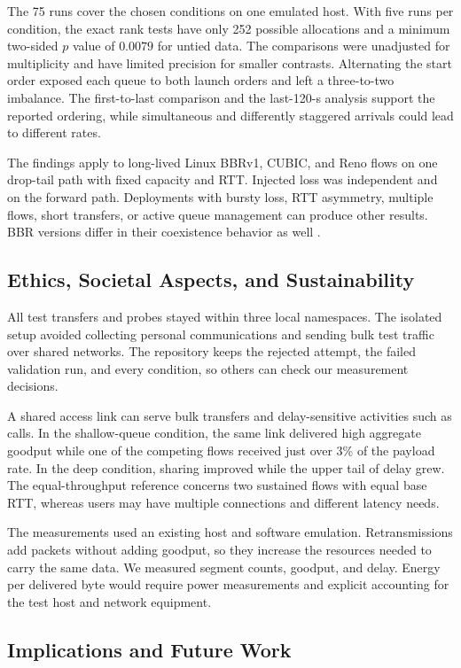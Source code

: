 \documentclass[11pt,a4paper]{article}
\begin{document}
The 75 runs cover the chosen conditions on one emulated host. With five runs per condition, the exact rank tests have only 252 possible allocations and a minimum two-sided $p$ value of $0.0079$ for untied data. The comparisons were unadjusted for multiplicity and have limited precision for smaller contrasts. Alternating the start order exposed each queue to both launch orders and left a three-to-two imbalance. The first-to-last comparison and the last-120-s analysis support the reported ordering, while simultaneous and differently staggered arrivals could lead to different rates.

The findings apply to long-lived Linux BBRv1, CUBIC, and Reno flows on one drop-tail path with fixed capacity and RTT. Injected loss was independent and on the forward path. Deployments with bursty loss, RTT asymmetry, multiple flows, short transfers, or active queue management can produce other results. BBR versions differ in their coexistence behavior as well \cite{sarpkaya2025}.

\subsection{Ethics, Societal Aspects, and Sustainability}

All test transfers and probes stayed within three local namespaces. The isolated setup avoided collecting personal communications and sending bulk test traffic over shared networks. The repository keeps the rejected attempt, the failed validation run, and every condition, so others can check our measurement decisions.

A shared access link can serve bulk transfers and delay-sensitive activities such as calls. In the shallow-queue condition, the same link delivered high aggregate goodput while one of the competing flows received just over 3\% of the payload rate. In the deep condition, sharing improved while the upper tail of delay grew. The equal-throughput reference concerns two sustained flows with equal base RTT, whereas users may have multiple connections and different latency needs.

The measurements used an existing host and software emulation. Retransmissions add packets without adding goodput, so they increase the resources needed to carry the same data. We measured segment counts, goodput, and delay. Energy per delivered byte would require power measurements and explicit accounting for the test host and network equipment.

\subsection{Implications and Future Work}
\end{document}
